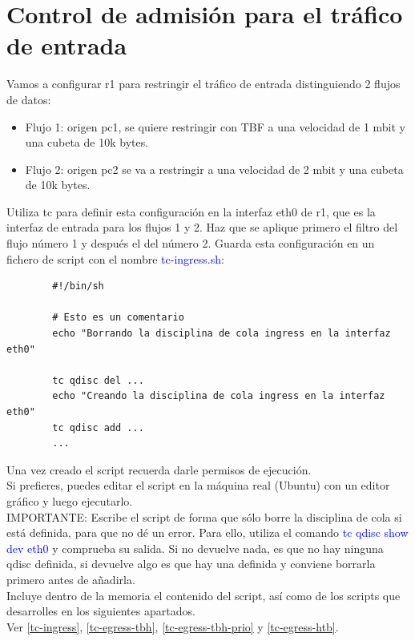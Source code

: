\documentclass[12pt, a4paper]{report}
\begin{document}
\section{Control de admisión para el tráfico de entrada}
Vamos a configurar r1 para restringir el tráfico de entrada distinguiendo 2 flujos de datos:
\begin{itemize}
	\item Flujo 1: origen pc1, se quiere restringir con TBF a una velocidad de 1 mbit y una cubeta de
	10k bytes.
	\item Flujo 2: origen pc2 se va a restringir a una velocidad de 2 mbit y una cubeta de 10k bytes.
\end{itemize}
Utiliza tc para definir esta configuración en la interfaz eth0 de r1, que es la interfaz de entrada
para los flujos 1 y 2. Haz que se aplique primero el filtro del flujo número 1 y después el del número
2. Guarda esta configuración en un fichero de script con el nombre \textcolor{blue}{tc-ingress.sh}:
\begin{center}
	\begin{verbatim}
		#!/bin/sh
		
		# Esto es un comentario
		echo "Borrando la disciplina de cola ingress en la interfaz eth0"
		
		tc qdisc del ...
		echo "Creando la disciplina de cola ingress en la interfaz eth0"
		tc qdisc add ...
		...
	\end{verbatim}
\end{center}
Una vez creado el script recuerda darle permisos de ejecución.\\

Si prefieres, puedes editar el script en la máquina real (Ubuntu) con un editor gráfico y luego
ejecutarlo.\\

IMPORTANTE: Escribe el script de forma que sólo borre la disciplina de cola si está definida, para
que no dé un error. Para ello, utiliza el comando \textcolor{blue}{tc qdisc show dev eth0} y comprueba su salida.
Si no devuelve nada, es que no hay ninguna qdisc definida, si devuelve algo es que hay una definida y
conviene borrarla primero antes de añadirla.\\

Incluye dentro de la memoria el contenido del script, así como de los scripts que desarrolles en los
siguientes apartados.\\

 Ver \ref{tc-ingress}, \ref{tc-egress-tbh}, \ref{tc-egress-tbh-prio} y \ref{tc-egress-htb}.
\end{document}
